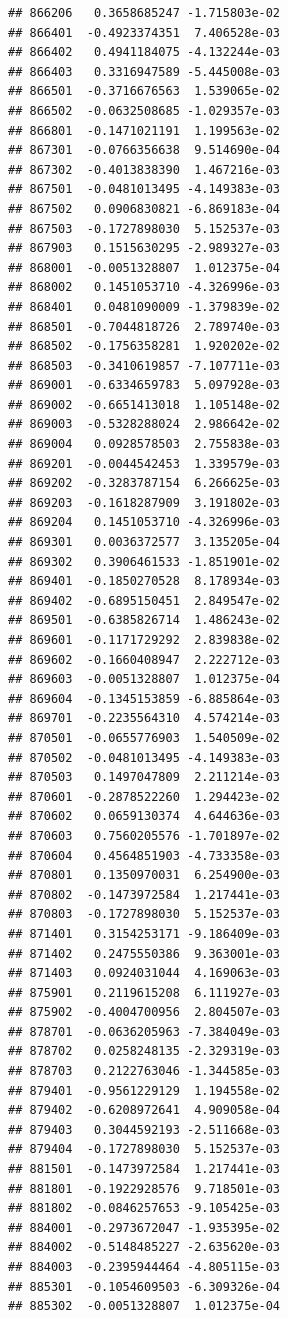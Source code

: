 \documentclass[ignorenonframetext,]{beamer}
\begin{document}
\begin{frame}[fragile]
\begin{verbatim}
## 866206   0.3658685247 -1.715803e-02
## 866401  -0.4923374351  7.406528e-03
## 866402   0.4941184075 -4.132244e-03
## 866403   0.3316947589 -5.445008e-03
## 866501  -0.3716676563  1.539065e-02
## 866502  -0.0632508685 -1.029357e-03
## 866801  -0.1471021191  1.199563e-02
## 867301  -0.0766356638  9.514690e-04
## 867302  -0.4013838390  1.467216e-03
## 867501  -0.0481013495 -4.149383e-03
## 867502   0.0906830821 -6.869183e-04
## 867503  -0.1727898030  5.152537e-03
## 867903   0.1515630295 -2.989327e-03
## 868001  -0.0051328807  1.012375e-04
## 868002   0.1451053710 -4.326996e-03
## 868401   0.0481090009 -1.379839e-02
## 868501  -0.7044818726  2.789740e-03
## 868502  -0.1756358281  1.920202e-02
## 868503  -0.3410619857 -7.107711e-03
## 869001  -0.6334659783  5.097928e-03
## 869002  -0.6651413018  1.105148e-02
## 869003  -0.5328288024  2.986642e-02
## 869004   0.0928578503  2.755838e-03
## 869201  -0.0044542453  1.339579e-03
## 869202  -0.3283787154  6.266625e-03
## 869203  -0.1618287909  3.191802e-03
## 869204   0.1451053710 -4.326996e-03
## 869301   0.0036372577  3.135205e-04
## 869302   0.3906461533 -1.851901e-02
## 869401  -0.1850270528  8.178934e-03
## 869402  -0.6895150451  2.849547e-02
## 869501  -0.6385826714  1.486243e-02
## 869601  -0.1171729292  2.839838e-02
## 869602  -0.1660408947  2.222712e-03
## 869603  -0.0051328807  1.012375e-04
## 869604  -0.1345153859 -6.885864e-03
## 869701  -0.2235564310  4.574214e-03
## 870501  -0.0655776903  1.540509e-02
## 870502  -0.0481013495 -4.149383e-03
## 870503   0.1497047809  2.211214e-03
## 870601  -0.2878522260  1.294423e-02
## 870602   0.0659130374  4.644636e-03
## 870603   0.7560205576 -1.701897e-02
## 870604   0.4564851903 -4.733358e-03
## 870801   0.1350970031  6.254900e-03
## 870802  -0.1473972584  1.217441e-03
## 870803  -0.1727898030  5.152537e-03
## 871401   0.3154253171 -9.186409e-03
## 871402   0.2475550386  9.363001e-03
## 871403   0.0924031044  4.169063e-03
## 875901   0.2119615208  6.111927e-03
## 875902  -0.4004700956  2.804507e-03
## 878701  -0.0636205963 -7.384049e-03
## 878702   0.0258248135 -2.329319e-03
## 878703   0.2122763046 -1.344585e-03
## 879401  -0.9561229129  1.194558e-02
## 879402  -0.6208972641  4.909058e-04
## 879403   0.3044592193 -2.511668e-03
## 879404  -0.1727898030  5.152537e-03
## 881501  -0.1473972584  1.217441e-03
## 881801  -0.1922928576  9.718501e-03
## 881802  -0.0846257653 -9.105425e-03
## 884001  -0.2973672047 -1.935395e-02
## 884002  -0.5148485227 -2.635620e-03
## 884003  -0.2395944464 -4.805115e-03
## 885301  -0.1054609503 -6.309326e-04
## 885302  -0.0051328807  1.012375e-04

\end{verbatim}
\end{frame}
\end{document}
